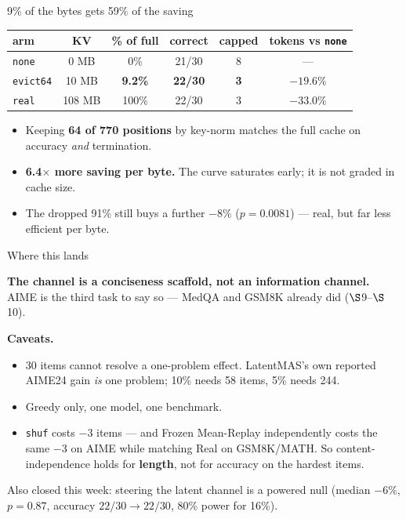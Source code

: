 \documentclass[aspectratio=169]{beamer}
\begin{document}
\begin{frame}{9\% of the bytes gets 59\% of the saving}

\begin{center}
\begin{tabular}{lccccc}
\toprule
arm & KV & \% of full & correct & capped & tokens vs \texttt{none} \\
\midrule
\texttt{none}    & 0 MB    & 0\%   & 21/30 & 8 & --- \\
\texttt{evict64} & 10 MB   & \textbf{9.2\%} & \textbf{22/30} & \textbf{3} & $\mathbf{-19.6\%}$ \\
\texttt{real}    & 108 MB  & 100\% & 22/30 & 3 & $-33.0\%$ \\
\bottomrule
\end{tabular}
\end{center}

\vspace{0.7em}
\begin{itemize}
  \item Keeping \textbf{64 of 770 positions} by key-norm matches the full cache on
        accuracy \emph{and} termination.
  \item \textbf{6.4$\times$ more saving per byte.} The curve saturates early; it is
        not graded in cache size.
  \item The dropped 91\% still buys a further $-8\%$ ($p=0.0081$) --- real, but far
        less efficient per byte.
\end{itemize}

\end{frame}

\begin{frame}{Where this lands}

\textbf{The channel is a conciseness scaffold, not an information channel.}
AIME is the third task to say so --- MedQA and GSM8K already did ($\S$9--$\S$10).

\vspace{0.8em}
\textbf{Caveats.}
\begin{itemize}
  \item 30 items cannot resolve a one-problem effect. LatentMAS's own reported
        AIME24 gain \emph{is} one problem; 10\% needs 58 items, 5\% needs 244.
  \item Greedy only, one model, one benchmark.
  \item \texttt{shuf} costs $-3$ items --- and Frozen Mean-Replay independently
        costs the same $-3$ on AIME while matching Real on GSM8K/MATH. So
        content-independence holds for \textbf{length}, not for accuracy on the
        hardest items.
\end{itemize}

\vspace{0.6em}
\footnotesize Also closed this week: steering the latent channel is a powered null
(median $-6\%$, $p=0.87$, accuracy $22/30 \to 22/30$, 80\% power for 16\%).

\end{frame}
\end{document}
